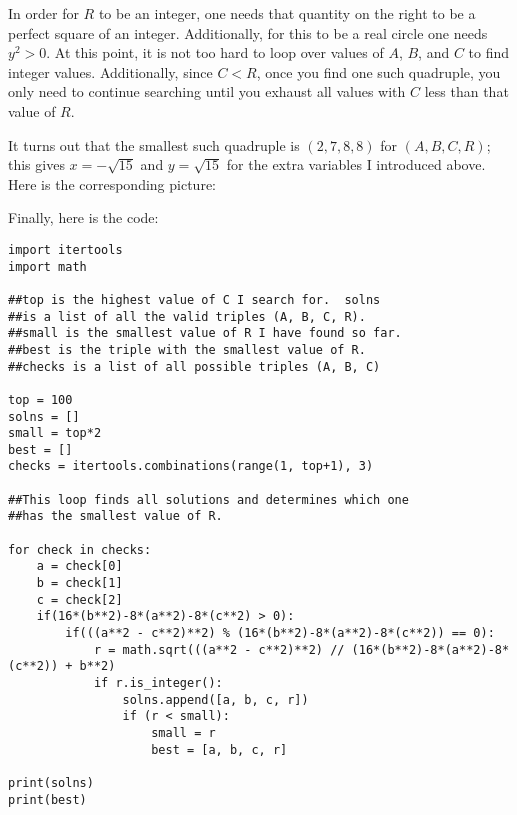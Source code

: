 \documentclass[11pt]{article}
\theoremstyle{definition}
\begin{document}
In order for $R$ to be an integer, one needs that quantity on the right to be a perfect square of an integer.  Additionally, for this to be a real circle one needs $y^2 > 0$.  At this point, it is not too hard to loop over values of $A$, $B$, and $C$ to find integer values.  Additionally, since $C < R$, once you find one such quadruple, you only need to continue searching until you exhaust all values with $C$ less than that value of $R$.

It turns out that the smallest such quadruple is $(2, 7, 8, 8)$ for $(A, B, C, R)$; this gives $x = -\sqrt{15}$ and $y = \sqrt{15}$ for the extra variables I introduced above.  Here is the corresponding picture:

Finally, here is the code:
\begin{verbatim}
import itertools
import math

##top is the highest value of C I search for.  solns
##is a list of all the valid triples (A, B, C, R).
##small is the smallest value of R I have found so far.
##best is the triple with the smallest value of R.
##checks is a list of all possible triples (A, B, C)

top = 100
solns = []
small = top*2
best = []
checks = itertools.combinations(range(1, top+1), 3)

##This loop finds all solutions and determines which one
##has the smallest value of R.

for check in checks:
    a = check[0]
    b = check[1]
    c = check[2]
    if(16*(b**2)-8*(a**2)-8*(c**2) > 0):
        if(((a**2 - c**2)**2) % (16*(b**2)-8*(a**2)-8*(c**2)) == 0):
            r = math.sqrt(((a**2 - c**2)**2) // (16*(b**2)-8*(a**2)-8*(c**2)) + b**2)
            if r.is_integer():
                solns.append([a, b, c, r])
                if (r < small):
                    small = r
                    best = [a, b, c, r]

print(solns)
print(best)
\end{verbatim}
\end{document}
